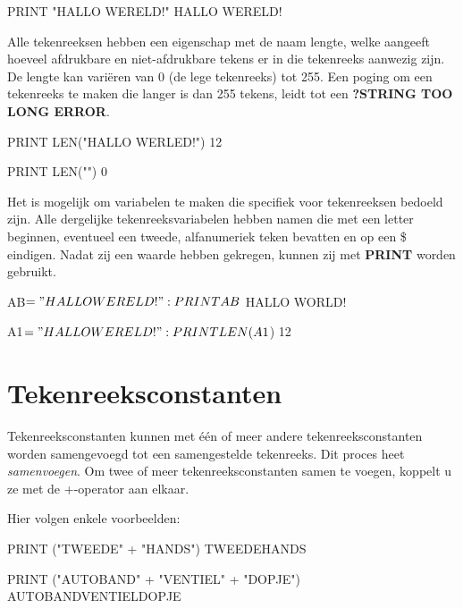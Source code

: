 \begin{screencode}
PRINT "HALLO WERELD!"
HALLO WERELD!
\end{screencode}

Alle tekenreeksen hebben een eigenschap met de naam lengte, welke aangeeft hoeveel afdrukbare en niet-afdrukbare tekens er in die tekenreeks aanwezig zijn. De lengte kan variëren van 0 (de lege tekenreeks) tot 255. Een poging om een tekenreeks te maken die langer is dan 255 tekens, leidt tot een {\bf ?STRING TOO LONG ERROR}.

\begin{screencode}
PRINT LEN("HALLO WERLED!")
 12
\end{screencode}

\begin{screencode}
PRINT LEN("")
 0
\end{screencode}

Het is mogelijk om variabelen te maken die specifiek voor tekenreeksen bedoeld zijn. Alle dergelijke tekenreeksvariabelen hebben namen die met een letter beginnen, eventueel een tweede, alfanumeriek teken bevatten en op een \$ eindigen. Nadat zij een waarde hebben gekregen, kunnen zij met {\bf PRINT} worden gebruikt.

\begin{screencode}
AB$ = "HALLO WERELD!": PRINT AB$
HALLO WORLD!
\end{screencode}

\begin{screencode}
A1$ = "HALLO WERELD!": PRINT LEN(A1$)
 12
\end{screencode}

\section{Tekenreeksconstanten}Tekenreeksconstanten kunnen met één of meer andere tekenreeksconstanten worden samengevoegd tot een samengestelde tekenreeks. Dit proces heet {\it samenvoegen}. Om twee of meer tekenreeksconstanten samen te voegen, koppelt u ze met de +-operator aan elkaar.

Hier volgen enkele voorbeelden:

\begin{screencode}
PRINT ("TWEEDE" + "HANDS")
TWEEDEHANDS
\end{screencode}

\begin{screencode}
PRINT ("AUTOBAND" + "VENTIEL" + "DOPJE")
AUTOBANDVENTIELDOPJE
\end{screencode}

